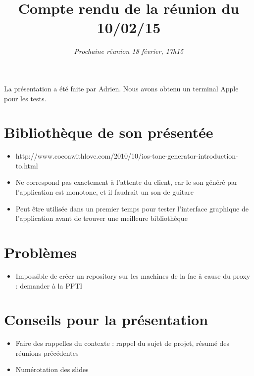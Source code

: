 \documentclass{scrartcl}
\begin{document}

\title{Compte rendu de la réunion du 10/02/15}
\subtitle{\textit{Prochaine réunion 18 février, 17h15}\vspace{-5ex}}
\date{}
\maketitle

La présentation a été faite par Adrien.
Nous avons obtenu un terminal Apple pour les tests.

\section{Bibliothèque de son présentée}
\begin{itemize}
  \item http://www.cocoawithlove.com/2010/10/ios-tone-generator-introduction-to.html

  \item Ne correspond pas exactement à l'attente du client, car le son généré par l'application est monotone, et il faudrait un son de guitare

  \item Peut être utilisée dans un premier temps pour tester l'interface graphique de l'application avant de trouver une meilleure bibliothèque

\end{itemize}


\section{Problèmes}
\begin{itemize}
  \item Impossible de créer un repository sur les machines de la fac à cause du proxy : demander à la PPTI
\end{itemize}

\section{Conseils pour la présentation}
\begin{itemize}
  \item Faire des rappelles du contexte : rappel du sujet de projet, résumé des réunions précédentes
  \item Numérotation des slides
\end{itemize}
\end{document}
